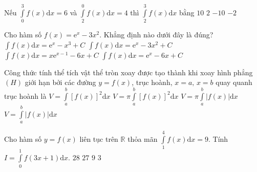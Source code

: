 \begin{ex}%
	Nếu $\displaystyle\int\limits_0^3 f(x)\mathrm{d}x=6$ và $\displaystyle\int\limits_2^0 f(x)\mathrm{d}x=4$ thì $\displaystyle\int\limits_2^3 f(x)\mathrm{d}x$ bằng
	\choice
	{\True $10$}
	{$2$}
	{$-10$}
	{$-2$}
\end{ex}
\begin{ex}%
	Cho hàm số $f(x)=\mathrm{e}^x-3x^2$. Khẳng định nào dưới đây là đúng?
	\choice
	{\True $\displaystyle\int f(x)\mathrm{d}x=\mathrm{e}^x-x^3+C$}
	{$\displaystyle\int f(x)\mathrm{d}x=\mathrm{e}^x-3x^2+C$}
	{$\displaystyle\int f(x)\mathrm{d}x=x\mathrm{e}^{x-1}-6x+C$}
	{$\displaystyle\int f(x)\mathrm{d}x=\mathrm{e}^x-6x+C$}
\end{ex}
\begin{ex}%
	Công thức tính thể tích vật thể tròn xoay được tạo thành khi xoay hình phẳng $\left( H \right)$ giới hạn bởi các đường $y=f\left( x \right)$, trục hoành, $x=a,\,x=b$ quay quanh trục hoành là
	\choice
	{$V=\displaystyle\int\limits_a^b \left[ f\left( x \right) \right]^2\mathrm{d}x$}
	{\True $V=\pi \displaystyle\int\limits_a^b \left[ f\left( x \right) \right]^2\mathrm{d}x$}
	{$V=\pi \displaystyle\int\limits_a^b \left| f\left( x \right) \right|\mathrm{d}x$}
	{$V=\displaystyle\int\limits_a^b \left| f\left( x \right) \right|\mathrm{d}x$}
\end{ex}
\begin{ex}%
	Cho hàm số $y=f\left( x \right)$ liên tục trên $\mathbb{R}$ thỏa mãn $\displaystyle\int\limits_1^4 f\left( x \right)\mathrm{d}x=9$. Tính $I=\displaystyle\int\limits_0^1 f\left( 3x+1 \right)\mathrm{d}x$.
	\choice
	{$28$}
	{$27$}
	{$9$}
	{\True $3$}
\end{ex}
